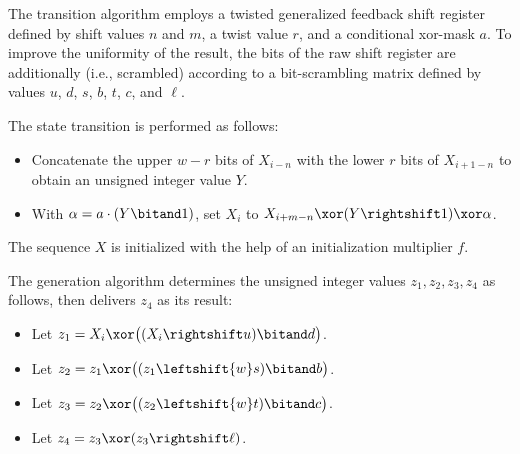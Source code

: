 \pnum
The transition algorithm
employs a twisted generalized feedback shift register
defined by shift values $n$ and $m$, a twist value $r$,
and a conditional xor-mask $a$.
To improve the uniformity of the result,
the bits of the raw shift register are additionally 
(i.e., scrambled) according to a bit-scrambling matrix
defined by values $u$, $d$, $s$, $b$, $t$, $c$, and $\ell$.

The state transition is performed as follows:
\begin{itemize}
 \item
   Concatenate
     the upper $w-r$ bits of $X_{i-n}$
   with
     the lower $r$ bits of $X_{i+1-n}$
   to obtain an unsigned integer value $Y$.
 \item
   With $\alpha = a \cdot (Y \bitand 1)$,
   set $X_i$ to
     $X_{i+m-n} \xor (Y \rightshift 1) \xor \alpha$.
\end{itemize}
The sequence $X$ is initialized
with the help of an initialization multiplier $f$.

\pnum
The generation algorithm
 determines the unsigned integer values $z_1, z_2, z_3, z_4$ as follows,
 then delivers $z_4$ as its result:
\begin{itemize}
 \item
   Let $z_1 = X_i \xor \bigl(( X_i \rightshift u ) \bitand d\bigr)$.
 \item
   Let $z_2 = z_1 \xor \bigl( (z_1 \leftshift{w} s) \bitand b \bigr)$.
 \item
   Let $z_3 = z_2 \xor \bigl( (z_2 \leftshift{w} t) \bitand c \bigr)$.
 \item
   Let $z_4 = z_3 \xor ( z_3 \rightshift \ell )$.
\end{itemize}

